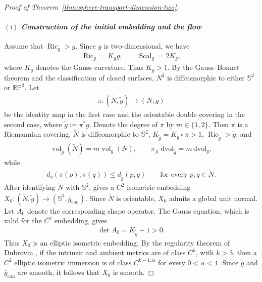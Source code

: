 \documentclass[11pt,reqno]{amsart}
\numberwithin{equation}{section}
\theoremstyle{definition}
\theoremstyle{remark}
\def\bS {\mathbb{S}}
\newcommand{\0}{\emptyset}
\newcommand{\Ric}{\operatorname{Ric}}
\newcommand{\can}{\mathrm{can}}
\newcommand{\vol}{\operatorname{vol}}
\newcommand{\dvol}{\,\mathrm{dvol}}
\begin{document}
\begin{proof}[Proof of Theorem~\ref{thm:sphere-transport-dimension-two}]
\paragraph{$\mathrm{(i)}$ \textit{Construction of the initial embedding and the flow}}
Assume that $\Ric_g>g$. Since $g$ is two-dimensional, we have
\begin{align}
        \Ric_g
        =
        K_g g,
        \qquad
        \operatorname{Scal}_g
        =
        2K_g,
\end{align}
where $K_g$ denotes the Gauss curvature. Thus $K_g>1$. By the Gauss--Bonnet theorem and the classification of closed
surfaces, $N^2$ is diffeomorphic to either $\bS^2$ or $\mathbb{RP}^2$. Let
\begin{align}
        \pi:(\widetilde N,\widetilde g)\to(N,g)
\end{align}
be the identity map in the first case and the orientable double covering in the
second case, where $\widetilde g:=\pi^*g$. Denote the degree of $\pi$ by
$m\in\{1,2\}$. Then $\pi$ is a Riemannian covering, $\widetilde N$ is
diffeomorphic to $\bS^2$, $K_{\widetilde g}=K_g\circ\pi>1$, $\Ric_{\widetilde g}>\widetilde g$, and
\begin{align}\label{eq:sphere-transport-dimension-two-covering-identities}
        \vol_{\widetilde g}(\widetilde N)
        =
        m\vol_g(N),
        \qquad
        \pi_\#\dvol_{\widetilde g}
        =
        m\dvol_g,
\end{align}
while
\begin{align}\label{eq:sphere-transport-dimension-two-covering-distance}
        d_g(\pi(p),\pi(q))
        \leq
        d_{\widetilde g}(p,q)
        \qquad
        \text{for every }p,q\in\widetilde N.
\end{align}
After identifying $\widetilde N$ with $\bS^2$, \cite[Theorem~1.3]{lu2020weyl} gives a $C^2$ isometric embedding $ X_0:(\widetilde N,\widetilde g) \to  (\bS^3,\bar g_{\can}).$ Since $\widetilde N$ is orientable, $X_0$ admits a global unit normal.
Let $A_0$ denote the corresponding shape operator. The Gauss equation,
which is valid for the $C^2$ embedding, gives
\begin{align}
        \det A_0
        =
        K_{\widetilde g}-1
        >
        0.
\end{align}
Thus $X_0$ is an elliptic isometric embedding. By the regularity theorem
of Dubrovin \cite{dubrovin1966regularity}, if the intrinsic
and ambient metrics are of class $C^k$, with $k>3$, then a $C^2$
elliptic isometric immersion is of class $C^{k-1,\alpha}$ for every
$0<\alpha<1$. Since $\widetilde g$ and $\bar g_{\can}$ are smooth, it
follows that $X_0$ is smooth.


\end{proof}
\end{document}
